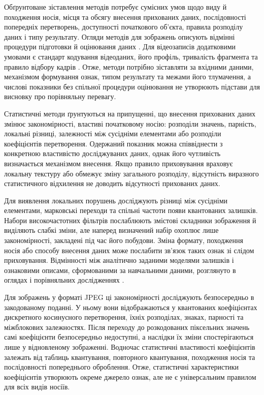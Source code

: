 Обґрунтоване зіставлення методів потребує сумісних умов щодо виду й походження носія, місця та обсягу внесення прихованих даних, послідовності попередніх перетворень, доступності початкового об’єкта, правила розподілу даних і типу результату. Огляди методів для зображень описують відмінні процедури підготовки й оцінювання даних \cite{muralidharan2022race,kheddar2024review}. Для відеозаписів додатковими умовами є стандарт кодування відеоданих, його профіль, тривалість фрагмента та правило відбору кадрів \cite{bouzegza2022video}. Отже, методи потрібно зіставляти за вхідними даними, механізмом формування ознак, типом результату та межами його тлумачення, а числові показники без спільної процедури оцінювання не утворюють підстави для висновку про порівняльну перевагу.

Статистичні методи ґрунтуються на припущенні, що внесення прихованих даних змінює закономірності, властиві початковому носію: розподіли значень, парність, локальні різниці, залежності між сусідніми елементами або розподіли коефіцієнтів перетворення. Одержаний показник можна співвіднести з конкретною властивістю досліджуваних даних, однак його чутливість визначається механізмом внесення. Якщо правило приховування враховує локальну текстуру або обмежує зміну загального розподілу, відсутність виразного статистичного відхилення не доводить відсутності прихованих даних.

Для виявлення локальних порушень досліджують різниці між сусідніми елементами, марковські переходи та спільні частоти появи квантованих залишків. Набори високочастотних фільтрів послаблюють змістові складники зображення й виділяють слабкі зміни, але наперед визначений набір охоплює лише закономірності, закладені під час його побудови. Зміна формату, походження носія або способу внесення даних може послабити зв’язок таких ознак зі слідом приховування. Відмінності між аналітично заданими моделями залишків і ознаковими описами, сформованими за навчальними даними, розглянуто в оглядах і порівняльних дослідженнях \cite{kheddar2024review,muralidharan2022race,kuznetsov2024deep}.

Для зображень у форматі JPEG ці закономірності досліджують безпосередньо в закодованому поданні. У ньому вони відображаються у квантованих коефіцієнтах дискретного косинусного перетворення, їхніх розподілах, знаках, парності та міжблокових залежностях. Після переходу до розкодованих піксельних значень самі коефіцієнти безпосередньо недоступні, а наслідки їх зміни спостерігаються лише у відновленому зображенні. Водночас статистичні властивості коефіцієнтів залежать від таблиць квантування, повторного квантування, походження носія та послідовності попереднього оброблення. Отже, статистичні характеристики коефіцієнтів утворюють окреме джерело ознак, але не є універсальним правилом для всіх видів носіїв.

